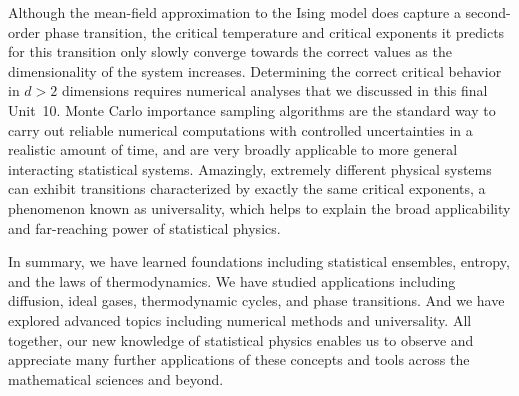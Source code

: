 Although the mean-field approximation to the Ising model does capture a second-order phase transition, the critical temperature and critical exponents it predicts for this transition only slowly converge towards the correct values as the dimensionality of the system increases.
Determining the correct critical behavior in $d > 2$ dimensions requires numerical analyses that we discussed in this final Unit~10.
Monte Carlo importance sampling algorithms are the standard way to carry out reliable numerical computations with controlled uncertainties in a realistic amount of time, and are very broadly applicable to more general interacting statistical systems.
Amazingly, extremely different physical systems can exhibit transitions characterized by exactly the same critical exponents, a phenomenon known as universality, which helps to explain the broad applicability and far-reaching power of statistical physics.

In summary, we have learned foundations including statistical ensembles, entropy, and the laws of thermodynamics.
We have studied applications including diffusion, ideal gases, thermodynamic cycles, and phase transitions.
And we have explored advanced topics including numerical methods and universality.
All together, our new knowledge of statistical physics enables us to observe and appreciate many further applications of these concepts and tools across the mathematical sciences and beyond.
